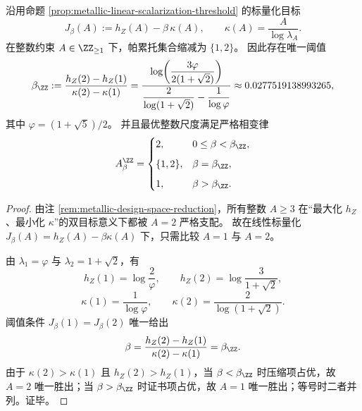 \begin{theorem}[整数尺度的线性标量化阈值]\label{thm:metallic-integer-scalarization-threshold}
沿用命题 \ref{prop:metallic-linear-scalarization-threshold} 的标量化目标
\[
J_\beta(A):=h_Z(A)-\beta\,\kappa(A),
\qquad
\kappa(A)=\frac{A}{\log\lambda_A}.
\]
在整数约束 \(A\in\ZZ_{\ge 1}\) 下，帕累托集合缩减为 \(\{1,2\}\)。
因此存在唯一阈值
\[
\beta_{\ZZ}
:=
\frac{h_Z(2)-h_Z(1)}{\kappa(2)-\kappa(1)}
=
\frac{\log\!\left(\dfrac{3\varphi}{2(1+\sqrt2)}\right)}
{\dfrac{2}{\log(1+\sqrt2)}-\dfrac{1}{\log\varphi}}
\approx 0.0277519138993265,
\]
其中 \(\varphi=(1+\sqrt5)/2\)。
并且最优整数尺度满足严格相变律
\[
A_\beta^{\ZZ}
=
\begin{cases}
2,& 0\le \beta<\beta_{\ZZ},\\[2mm]
\{1,2\},& \beta=\beta_{\ZZ},\\[2mm]
1,& \beta>\beta_{\ZZ}.
\end{cases}
\]
\end{theorem}
\begin{proof}
由注 \ref{rem:metallic-design-space-reduction}，所有整数 \(A\ge 3\) 在“最大化 \(h_Z\)、最小化 \(\kappa\)”的双目标意义下都被 \(A=2\) 严格支配。
故在线性标量化
\(
J_\beta(A)=h_Z(A)-\beta\kappa(A)
\)
下，只需比较 \(A=1\) 与 \(A=2\)。

由 \(\lambda_1=\varphi\) 与 \(\lambda_2=1+\sqrt2\)，有
\[
h_Z(1)=\log\frac{2}{\varphi},
\qquad
h_Z(2)=\log\frac{3}{1+\sqrt2},
\]
\[
\kappa(1)=\frac{1}{\log\varphi},
\qquad
\kappa(2)=\frac{2}{\log(1+\sqrt2)}.
\]
阈值条件 \(J_\beta(1)=J_\beta(2)\) 唯一给出
\[
\beta
=
\frac{h_Z(2)-h_Z(1)}{\kappa(2)-\kappa(1)}
=
\beta_{\ZZ}.
\]
由于 \(\kappa(2)>\kappa(1)\) 且 \(h_Z(2)>h_Z(1)\)，当 \(\beta<\beta_{\ZZ}\) 时压缩项占优，故 \(A=2\) 唯一胜出；当 \(\beta>\beta_{\ZZ}\) 时证书项占优，故 \(A=1\) 唯一胜出；等号时二者并列。证毕。
\end{proof}

